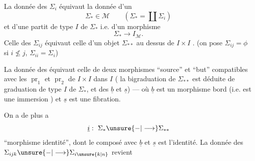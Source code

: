 
La donnée des \(\Sigma_i\) équivaut  la donnée d'un
\[
 \Sigma_*\in\mathcal M\qquad
 \left(\Sigma_*=\coprod\Sigma_i\right)
\]
et d'une partit de type \(I\) de \(\Sigma_*\) i.e. d'un morphisme
\[
 \Sigma_*\longrightarrow I_{\mathcal M}.
\]
Celle des \(\Sigma_{ij}\) équivaut  celle
d'un objet \(\Sigma_{**}\)  au dessus de \(I\times I\)
.
(on pose \(\Sigma_{ij}=\phi\) si \(i\not\le j\),
\(\Sigma_{ii}=\Sigma_i\))

La donnée des
équivaut  celle
de deux morphismes ``source'' et ``but''
\diagram{\begin{tikzcd}
 \Sigma_{**}\arrow[r,"\underline b"]\arrow[d,"\underline s"']&\Sigma_*\\
 \Sigma_*&
\end{tikzcd}}
compatibles avec les \(\operatorname{pr}_1\) et \(\operatorname{pr}_2\)
de \(I\times I\) dans \(I\)
(
 la bigraduation 
de \(\Sigma_{**}\) est déduite de 
graduation de type \(I\) de \(\Sigma_*\), et des
\(\underline b\) et \(\underline s\)) ---
où \(\underline b\) est 
un morphisme bord (i.e. est une
immersion ) et \(\underline s\) est une fibration.

On a de plus a \unsure{:}
\[
 \underline{i}:\ \Sigma_*\unsure{-|\longrightarrow}\Sigma_{**}
\]
``morphisme identité'', dont le composé avec \(\underline b\) et
\(\underline s\) est l'identité. La donnée des
\(\Sigma_{ijk}\unsure{-|\longrightarrow}\Sigma_{i\unsure{k|n}}\) revient 

